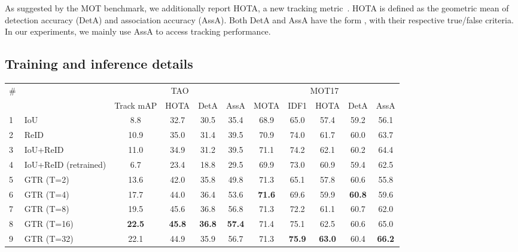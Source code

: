 \documentclass[10pt,twocolumn,letterpaper]{article}
\let\oldsubsection\subsection
\renewcommand{\subsection}[1]{\vspace{-1mm}\oldsubsection{#1}\vspace{-1mm}}
\newcommand{\lblsec}[1]{\label{sec:#1}}
\newcommand{\rowNumber}[1]{\textcolor{Cerulean}{#1}}
\begin{document}
As suggested by the MOT benchmark, we additionally report HOTA, a new tracking metric~\cite{luiten2021hota}.
HOTA is defined as the geometric mean of detection accuracy (DetA) and association accuracy (AssA).
Both DetA and AssA have the form , with their respective true/false criteria.
In our experiments, we mainly use AssA to access tracking performance.

\subsection{Training and inference details}
\lblsec{details}

\begin{table*}[!t]
\centering
\begin{tabular}{@{}l@{\ \ \ }l@{\ \ \ }c@{\ \ \ }c@{\ \ \ }c@{\ \ \ }c@{\ \ \ }c@{\ \ \ }c@{\ \ }c@{\ \ \ }c@{\ \ \ }c@{}}
\toprule
\rowNumber{\#} & & \multicolumn{4}{c}{TAO} & \multicolumn{5}{c}{MOT17} \\ 
 & & Track mAP & HOTA & DetA & AssA  & MOTA & IDF1 & HOTA & DetA & AssA \\
\cmidrule(r){1-2}
\cmidrule(r){3-6}
\cmidrule(r){7-11}
\rowNumber{1} & IoU ~\cite{Bewley2016_sort} & 8.8 & 32.7 & 30.5 & 35.4 & 68.9 & 65.0 & 57.4 & 59.2 & 56.1\\
\rowNumber{2} & ReID & 10.9 & 35.0 & 31.4 & 39.5 & 70.9 & 74.0 & 61.7 & 60.0 & 63.7 \\
\rowNumber{3} & IoU+ReID ~\cite{zhang2020fair} & 11.0 & 34.9 & 31.2 & 39.5 & 71.1 & 74.2 & 62.1 & 60.2 & 64.4 \\
\rowNumber{4} & IoU+ReID (retrained) & 6.7 & 23.4 & 18.8 & 29.5 & 69.9 & 73.0 & 60.9 & 59.4 & 62.5  \\
\cmidrule(r){1-2}
\cmidrule(r){3-6}
\cmidrule(r){7-11}
\rowNumber{5} & GTR (T=2) & 13.6 & 42.0 & 35.8 & 49.8 & 71.3 & 65.1 & 57.8 & 60.6 & 55.8 \\
\rowNumber{6} & GTR (T=4) & 17.7 & 44.0 & 36.4 & 53.6 & \bf 71.6 & 69.6 & 59.9 & \bf 60.8 & 59.6 \\ 
\rowNumber{7} & GTR (T=8) & 19.5 & 45.6 & 36.8 & 56.8 & 71.3 & 72.2 & 61.1 & 60.7 & 62.0 \\
\rowNumber{8} & GTR (T=16) & {\bf 22.5} & {\bf 45.8} & {\bf 36.8} & {\bf 57.4} & 71.4 & 75.1 & 62.5 & 60.6 & 65.0 \\ 
\rowNumber{9} & GTR (T=32) & 22.1 & 44.9 & 35.9 & 56.7 & 71.3 & {\bf 75.9} & {\bf 63.0} & 60.4 & {\bf 66.2} \\
\bottomrule
\end{tabular}
\vspace{-3mm}

\end{table*}
\end{document}
